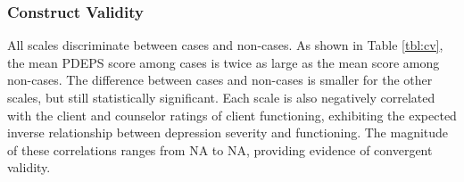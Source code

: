 \documentclass[man,natbib,longtable]{apa6}\usepackage[]{graphicx}\usepackage[]{color}
\begin{document}
\begin{table}
\rotatebox[origin=c]{90}{
  \centerline{\begin{threeparttable}
  \caption{Diagnostic validity}
  \label{tbl:dv}
  \centering
  \begin{tabular}{llllllllllllll}
  \toprule
  & & \multicolumn{6}{c}{DSM-5} & \multicolumn{6}{c}{Local} \\
  \cmidrule(lr){3-8} \cmidrule(lr){9-14}
  Scale & Cut & Sen & Spe & Acc & LRP & LRN & AUC & Sen & Spe & Acc & LRP & LRN & AUC \\
  \midrule
  \textit{Combined, N=193} & & & & & & & & & & & & & \\
  \expandableinput ../../master/output/tables/dv.tex
  \midrule
  \textit{Pregnant, n=61} & & & & & & & & & & & & & \\
  \expandableinput ../../master/output/tables/dvPr.tex
  \midrule
  \textit{Postpartum, n=132} & & & & & & & & & & & & & \\
  \expandableinput ../../master/output/tables/dvPp.tex
  \bottomrule
  \end{tabular}
  \begin{tablenotes}
  \small
  \item Note. Sen=sensitivity. Spe=specificity. Acc=accuracy (1-error rate). LRP=likelihood ratio (positive). LRN=likelihood radio (negative). AUC=area under the receiver operating characteristic curve.
  \end{tablenotes}
  \end{threeparttable}}\hspace{4cm}
}
\end{table}



\subsubsection{Construct Validity}

All scales discriminate between cases and non-cases. As shown in Table \ref{tbl:cv}, the mean PDEPS score among cases is twice as large as the mean score among non-cases. The difference between cases and non-cases is smaller for the other scales, but still statistically significant. Each scale is also negatively correlated with the client and counselor ratings of client functioning, exhibiting the expected inverse relationship between depression severity and functioning. The magnitude of these correlations ranges from NA to NA, providing evidence of convergent validity.
\end{document}
